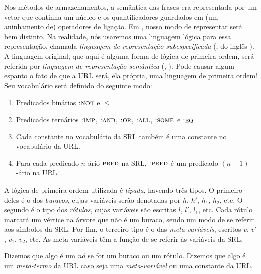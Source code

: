 
Nos métodos de armazenamentos, a semântica das frases era representada por um vetor que continha um núcleo e os quantificadores guardados em (um aninhamento de) operadores de ligação. Em , nosso modo de representar será bem distinto. Na realidade, nós usaremos uma linguagem lógica para essa representação, chamada \textit{linguagem de representação subespecificada} (, do inglês ). A linguagem original, que aqui é alguma forma de lógica de primeira ordem, será referida por \textit{linguagem de representação semântica} (, ). Pode causar algum espanto o fato de que a URL será, ela própria, uma linguagem de primeira ordem! Seu vocabulário será definido do seguinte modo:

\begin{enumerate}
\item Predicados binários $\textsc{:not}$ e $\leq$
\item Predicados ternários $\textsc{:imp}$, $\textsc{:and}$, $\textsc{:or}$, $\textsc{:all}$, $\textsc{:some}$ e $\textsc{:eq}$
\item Cada constante no vocabulário da SRL também é uma constante no vocabulário da URL.
\item Para cada predicado $n$-ário $\textsc{pred}$ na SRL, $\textsc{:pred}$ é um predicado $(n+1)$-ário na URL.
\end{enumerate}

A lógica de primeira ordem utilizada é \textit{tipada}, havendo três tipos. O primeiro deles é o dos \textit{buracos}, cujas variáveis serão denotadas por $h$, $h'$, $h_1$, $h_2$, etc. O segundo é o tipo dos \textit{rótulos}, cujas variáveis são escritas $l$, $l'$, $l_1$, etc. Cada rótulo marcará um vértice na árvore que não é um buraco, sendo um modo de se referir aos símbolos da SRL. Por fim, o terceiro tipo é o das \textit{meta-variáveis}, escritos $v$, $v'$, $v_1$, $v_2$, etc. As meta-variáveis têm a função de se referir às variáveis da SRL.

Dizemos que algo é um \textit{nó} se for um buraco ou um rótulo. Dizemos que algo é um \textit{meta-termo} da URL caso seja uma \textit{meta-variável} ou uma constante da URL.

